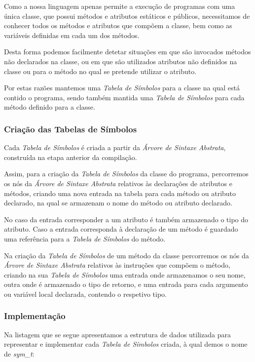 \documentclass[11pt,a4paper]{article}
\begin{document}
	Como a nossa linguagem apenas permite a execução de programas com uma única classe, que possui métodos e atributos estáticos e públicos, necessitamos de conhecer todos os métodos e atributos que compõem a classe, bem como as variáveis definidas em cada um dos métodos.
	
	Desta forma podemos facilmente detetar situações em que são invocados métodos não declarados na classe, ou em que são utilizados atributos não definidos na classe ou para o método no qual se pretende utilizar o atributo. 

	Por estas razões mantemos uma \emph{Tabela de Símbolos} para a classe na qual está contido o programa, sendo também mantida uma \emph{Tabela de Símbolos} para cada método definido para a classe.
	
	\subsubsection{Criação das Tabelas de Símbolos}
	
	Cada \emph{Tabela de Símbolos} é criada a partir da \emph{Árvore de Sintaxe Abstrata}, construída na etapa anterior da compilação.
	
	Assim, para a criação da \emph{Tabela de Símbolos} da classe do programa, percorremos os nós da \emph{Árvore de Sintaxe Abstrata} relativos às declarações de atributos e métodos, criando uma nova entrada na tabela para cada método ou atributo declarado, na qual se armazenam o nome do método ou atributo declarado.
	
	No caso da entrada corresponder a um atributo é também armazenado o tipo do atributo. Caso a entrada corresponda à declaração de um método é guardado uma referência para a \emph{Tabela de Símbolos} do método.
	
	Na criação da \emph{Tabela de Símbolos} de um método da classe percorremos os nós da \emph{Árvore de Sintaxe Abstrata} relativos às instruções que compõem o método, criando na sua \emph{Tabela de Símbolos} uma entrada onde armazenamos o seu nome, outra onde é armazenado o tipo de retorno, e uma entrada para cada argumento ou variável local declarada, contendo o respetivo tipo.
	
	\subsubsection{Implementação}
	
	Na listagem que se segue apresentamos a estrutura de dados utilizada para representar e implementar cada \emph{Tabela de Símbolos} criada, à qual demos o nome de \emph{sym\_t}:
	
\end{document}
